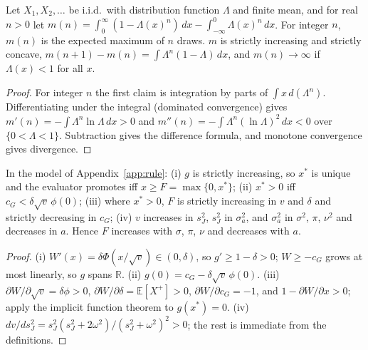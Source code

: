 \documentclass[acmsmall,screen,review]{acmart}
\theoremstyle{acmdefinition}
\begin{document}
\begin{lemma}\label{lem:max}
Let $X_1, X_2, \ldots$ be i.i.d.\ with distribution function $\Lambda$ and finite mean, and for real $n > 0$ let $m(n) = \int_0^\infty (1 - \Lambda(x)^n)\,dx - \int_{-\infty}^0 \Lambda(x)^n\,dx$. For integer $n$, $m(n)$ is the expected maximum of $n$ draws. $m$ is strictly increasing and strictly concave, $m(n+1) - m(n) = \int \Lambda^n(1-\Lambda)\,dx$, and $m(n) \to \infty$ if $\Lambda(x) < 1$ for all $x$.
\end{lemma}
\begin{proof}
For integer $n$ the first claim is integration by parts of $\int x\,d(\Lambda^n)$. Differentiating under the integral (dominated convergence) gives $m'(n) = -\int\Lambda^n\ln\Lambda\,dx > 0$ and $m''(n) = -\int\Lambda^n(\ln\Lambda)^2\,dx < 0$ over $\{0 < \Lambda < 1\}$. Subtraction gives the difference formula, and monotone convergence gives divergence.
\end{proof}

\begin{theorem}\label{thm:rule}
In the model of Appendix~\ref{app:rule}: (i) $g$ is strictly increasing, so $x^*$ is unique and the evaluator promotes iff $x \ge F = \max\{0,x^*\}$; (ii) $x^* > 0$ iff $c_G < \delta\sqrt{v}\,\phi(0)$; (iii) where $x^* > 0$, $F$ is strictly increasing in $v$ and $\delta$ and strictly decreasing in $c_G$; (iv) $v$ increases in $s_J^2$, $s_J^2$ in $\sigma_a^2$, and $\sigma_a^2$ in $\sigma^2$, $\pi$, $\nu^2$ and decreases in $a$. Hence $F$ increases with $\sigma$, $\pi$, $\nu$ and decreases with $a$.
\end{theorem}
\begin{proof}
(i) $W'(x) = \delta\Phi(x/\sqrt{v}) \in (0,\delta)$, so $g' \ge 1 - \delta > 0$; $W \ge -c_G$ grows at most linearly, so $g$ spans $\mathbb{R}$. (ii) $g(0) = c_G - \delta\sqrt{v}\,\phi(0)$. (iii) $\partial W/\partial\sqrt{v} = \delta\phi > 0$, $\partial W/\partial\delta = \mathbb{E}[X^+] > 0$, $\partial W/\partial c_G = -1$, and $1 - \partial W/\partial x > 0$; apply the implicit function theorem to $g(x^*) = 0$. (iv) $dv/ds_J^2 = s_J^2(s_J^2 + 2\omega^2)/(s_J^2 + \omega^2)^2 > 0$; the rest is immediate from the definitions.
\end{proof}
\end{document}
